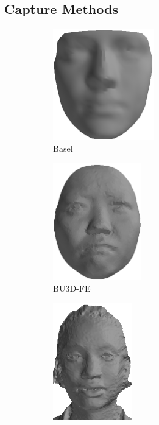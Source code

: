 \subsection{Capture Methods}\label{subsec:bg_capture}
\begin{figure}[ht]
	\centering
	\begin{subfigure}[b]{0.3\textwidth}
		\centering
		\includegraphics[height=1.9in]{background/images/basel}
		\caption{Basel~\cite{paysan20093d}}\label{fig:db_examples_basel}
	\end{subfigure}
	\begin{subfigure}[b]{0.3\textwidth}
		\centering
		\includegraphics[height=2in]{background/images/bu3d}
		\caption{BU3D-FE~\cite{Yin:2006cc}}\label{fig:db_examples_bu3d}
	\end{subfigure}
	\begin{subfigure}[b]{0.3\textwidth}
		\centering
		\includegraphics[height=2in]{background/images/bp4d}

\end{subfigure}
\end{figure}

